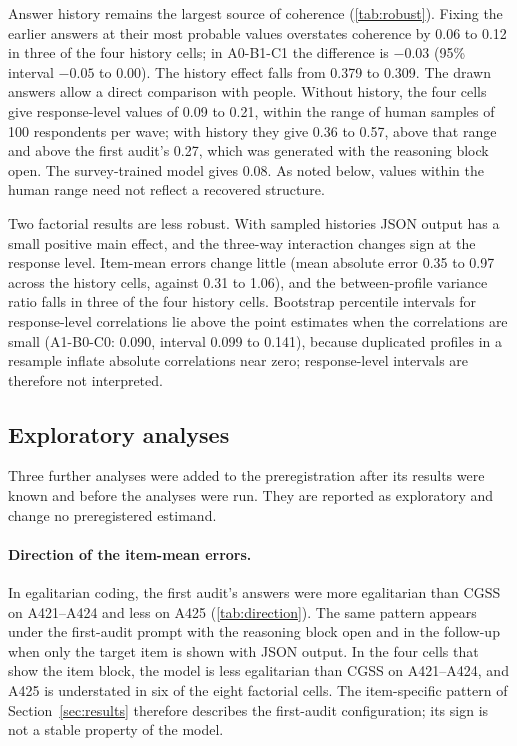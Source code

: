 \documentclass[11pt]{article}
\begin{document}
Answer history remains the largest source of coherence (\cref{tab:robust}). Fixing the earlier answers at their most probable values overstates coherence by 0.06 to 0.12 in three of the four history cells; in A0-B1-C1 the difference is $-0.03$ (95\% interval $-0.05$ to 0.00). The history effect falls from 0.379 to 0.309. The drawn answers allow a direct comparison with people. Without history, the four cells give response-level values of 0.09 to 0.21, within the range of human samples of 100 respondents per wave; with history they give 0.36 to 0.57, above that range and above the first audit's 0.27, which was generated with the reasoning block open. The survey-trained model gives 0.08. As noted below, values within the human range need not reflect a recovered structure.

Two factorial results are less robust. With sampled histories JSON output has a small positive main effect, and the three-way interaction changes sign at the response level. Item-mean errors change little (mean absolute error 0.35 to 0.97 across the history cells, against 0.31 to 1.06), and the between-profile variance ratio falls in three of the four history cells. Bootstrap percentile intervals for response-level correlations lie above the point estimates when the correlations are small (A1-B0-C0: 0.090, interval 0.099 to 0.141), because duplicated profiles in a resample inflate absolute correlations near zero; response-level intervals are therefore not interpreted.

\subsection{Exploratory analyses}

Three further analyses were added to the preregistration after its results were known and before the analyses were run. They are reported as exploratory and change no preregistered estimand.

\paragraph{Direction of the item-mean errors.} In egalitarian coding, the first audit's answers were more egalitarian than CGSS on A421--A424 and less on A425 (\cref{tab:direction}). The same pattern appears under the first-audit prompt with the reasoning block open and in the follow-up when only the target item is shown with JSON output. In the four cells that show the item block, the model is less egalitarian than CGSS on A421--A424, and A425 is understated in six of the eight factorial cells. The item-specific pattern of Section~\ref{sec:results} therefore describes the first-audit configuration; its sign is not a stable property of the model.
\end{document}
